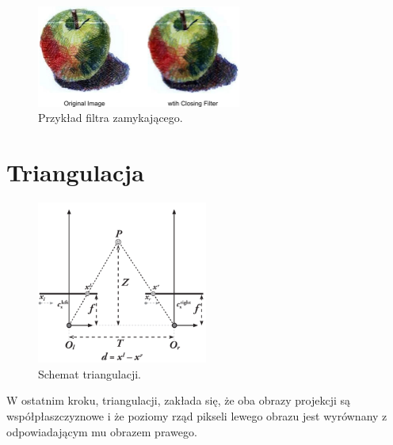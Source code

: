 \documentclass[magisterska]{pracadypl}
\begin{document}
\begin{figure}[H]  %
    \centering  %
    \includegraphics[width=0.6\textwidth]{images/closeF.png}  %
    \captionsetup{font=footnotesize}
    \caption[Przykład filtra zamykającego. https://www.graphicsmill.com/docs/gm/minimum-maximum-median-filters.htm]{Przykład filtra zamykającego.}
\end{figure}

\section{Triangulacja}

\begin{figure}[H]  %
    \centering  %
    \includegraphics[width=0.5\textwidth]{images/triangulation.png}  %
    \captionsetup{font=footnotesize}
    \caption[Schemat triangulacji. Learning OpenCV 3, O'Reilly, Str. 705]{Schemat triangulacji.}
    \label{fig:rpi}  %
\end{figure}

W ostatnim kroku, triangulacji, zakłada się, że oba obrazy projekcji są współpłaszczyznowe i że poziomy rząd pikseli lewego obrazu jest wyrównany z odpowiadającym mu obrazem prawego.
\end{document}
